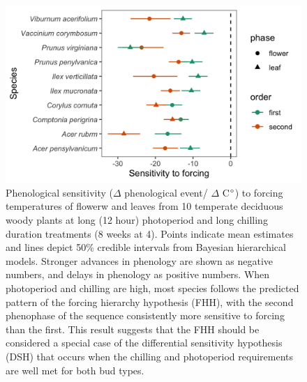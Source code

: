 \documentclass[11pt]{article}\usepackage[]{graphicx}\usepackage[]{color}
\begin{document}
\begin{figure}[h!]
    \centering
         \includegraphics[width=.8\textwidth]{..//Plots/Flobuds_manuscript_figs/PHH_plot.png}
    \caption{Phenological sensitivity ($\Delta$ phenological event/ $\Delta$ C$\degree$) to forcing temperatures of flowerw and leaves from 10 temperate deciduous woody plants at long (12 hour) photoperiod and long chilling duration treatments (8 weeks at 4\degree ). Points indicate mean estimates and lines depict 50\% credible intervals from Bayesian hierarchical models. Stronger advances in phenology are shown as negative numbers, and delays in phenology as positive numbers. When photoperiod and chilling are high, most species follows the predicted pattern of the forcing hierarchy hypothesis (FHH), with the second phenophase of the sequence consistently more sensitive to forcing than the first. This result suggests that the FHH should be considered a special case of the differential sensitivity hypothesis (DSH) that occurs when the chilling and photoperiod requirements are well met for both bud types.}
    \label{fig:FHH}
\end{figure}
\end{document}
